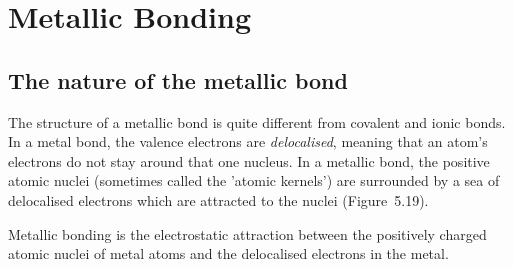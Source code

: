   \label{m38684**end}
         \section{Metallic Bonding}
    \nopagebreak
      \label{m38694*uid77}
            \subsection*{The nature of the metallic bond}
            \nopagebreak
        \label{m38694*id142901}The structure of a metallic bond is quite different from covalent and ionic bonds. In a metal bond, the valence electrons are \textsl{delocalised}, meaning that an atom's electrons do not stay around that one nucleus. In a metallic bond, the positive atomic nuclei (sometimes called the 'atomic kernels') are surrounded by a sea of delocalised electrons which are attracted to the nuclei (Figure~5.19).\par 
\label{m38694*fhsst!!!underscore!!!id582}
 { \label{m38694*meaningfhsst!!!underscore!!!id582}
Metallic bonding is the electrostatic attraction between the positively charged atomic nuclei of metal atoms and the delocalised electrons in the metal.}
